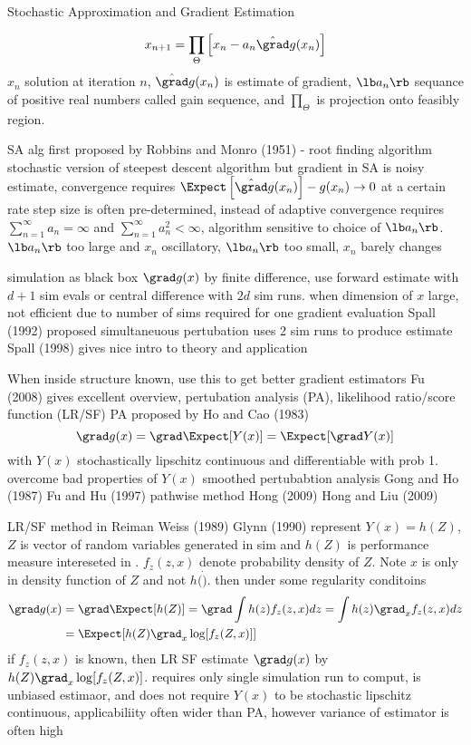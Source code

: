 Stochastic Approximation and Gradient Estimation

\begin{equation}
x_{n+1} = \prod_\Theta \left[ x_n - a_n \hat{\grad} g(x_n) \right]
\end{equation}
$x_n$ solution at iteration $n$, $\hat\grad g(x_n)$ is estimate of gradient, $\lb a_n \rb$ sequance of positive real numbers called gain sequence, and $\prod_\Theta$ is projection onto feasibly region.

SA alg first proposed by Robbins and Monro (1951) - root finding algorithm
stochastic version of steepest descent algorithm
but gradient in SA is noisy estimate, convergence requires $\Expect \left[ \hat \grad g(x_n) \right] - g(x_n) \rightarrow 0$ at a certain rate
step size is often pre-determined, instead of adaptive
convergence requires $\sum_{n=1}^\infty a_n = \infty$ and $\sum_{n=1}^\infty a_n^2 < \infty$, algorithm sensitive to choice of $\lb a_n \rb$.  $\lb a_n \rb $ too large and $x_n$ oscillatory, $\lb a_n \rb $ too small, $x_n$ barely changes

simulation as black box $\grad g(x)$ by finite difference, use forward estimate with $d+1$ sim evals or central difference with $2d$ sim runs.
when dimension of $x$ large, not efficient due to number of sims required for one gradient evaluation
Spall (1992) proposed simultaneuous pertubation uses 2 sim runs to produce estimate
Spall (1998) gives nice intro to theory and application

When inside structure known, use this to get better gradient estimators
Fu (2008) gives excellent overview, pertubation analysis (PA), likelihood ratio/score function (LR/SF)
PA proposed by Ho and Cao (1983)
\begin{equation}
\grad g(x) = \grad \Expect [ Y(x) ] = \Expect [ \grad Y (x) ] 
\end{equation}
with $Y(x)$ stochastically lipschitz continuous and differentiable with prob 1.
overcome bad properties of $Y(x)$
smoothed pertubabtion analysis Gong and Ho (1987) Fu and Hu (1997)
pathwise method Hong (2009) Hong and Liu (2009)

LR/SF method in Reiman Weiss (1989) Glynn (1990)
represent $Y(x) = h(Z)$, $Z$ is vector of random variables generated in sim and $h(Z)$ is performance measure intereseted in .  $f_z(z,x)$ denote probability density of $Z$.  Note $x$ is only in density function of $Z$ and not $h(\dot)$.
then under some regularity conditoins
\begin{align}
\grad g(x) &= \grad \Expect [ h(Z) ] = \grad \int h(z) f_z(z,x) dz = \int h(z) \grad_x f_z(z,x) dz \\
	&= \Expect [ h(Z) \grad_x \log [ f_z(Z,x) ] ]
\end{align}
if $f_z(z,x)$ is known, then LR SF estimate $\grad g(x)$ by $h(Z) \grad_x \log [ f_z(Z,x) ]$. requires only single simulation run to comput, is unbiased estimaor, and does not require $Y(x)$ to be stochastic lipschitz continuous, applicabiliity often wider than PA, however variance of estimator is often high

